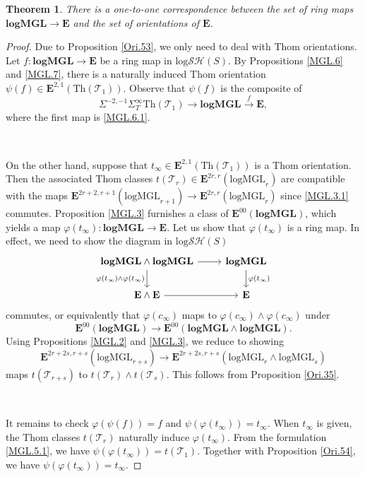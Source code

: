 \documentclass[11pt, a4paper]{amsart}
\newtheorem{thm}{Theorem}[subsection]
\theoremstyle{definition}
\numberwithin{equation}{subsection}
\newcommand{\Thom}{\mathrm{Th}}
\newcommand{\logMGL}{{\mathrm{logMGL}}}
\newcommand{\spectlogMGL}{{\mathbf{logMGL}}}
\newcommand{\cT}{\mathcal{T}}
\newcommand{\ringE}{\mathbf{E}}
\newcommand{\inflogSH}{\mathrm{log}\mathcal{SH}}
\begin{document}
\begin{thm}
\label{MGL.5}
There is a one-to-one correspondence between the set of ring maps $\spectlogMGL\to \ringE$ 
and the set of orientations of $\ringE$.
\end{thm}
\begin{proof}
Due to Proposition \ref{Ori.53}, we only need to deal with Thom orientations.
Let $f\colon \spectlogMGL\to \ringE$ be a ring map in $\inflogSH(S)$.
By Propositions \ref{MGL.6} and \ref{MGL.7}, 
there is a naturally induced Thom orientation $\psi(f)\in \ringE^{2,1}(\Thom(\cT_1))$.
Observe that $\psi(f)$ is the composite of
\begin{equation}
\label{MGL.5.1}
\Sigma^{-2,-1}\Sigma_T^\infty \Thom(\cT_1)\to \spectlogMGL\xrightarrow{f}\ringE,
\end{equation}
where the first map is \eqref{MGL.6.1}.

\

On the other hand, 
suppose that $t_\infty\in \ringE^{2,1}(\Thom(\cT_1))$ is a Thom orientation.
Then the associated Thom classes $t(\cT_r)\in \ringE^{2r,r}(\logMGL_r)$ are 
compatible with the maps 
$\ringE^{2r+2,r+1}(\logMGL_{r+1})\to \ringE^{2r,r}(\logMGL_r)$ since 
\eqref{MGL.3.1} commutes.
Proposition \ref{MGL.3} furnishes
a class of $\ringE^{00}(\spectlogMGL)$,
which yields a map $\varphi(t_\infty)\colon \spectlogMGL\to \ringE$.
Let us show that $\varphi(t_\infty)$ is a ring map.
In effect, we need to show the diagram in $\inflogSH(S)$
\[
\begin{tikzcd}
\spectlogMGL\wedge \spectlogMGL\ar[r]\ar[d,"\varphi(t_\infty)\wedge\varphi(t_\infty)"']&
\spectlogMGL\ar[d,"\varphi(t_\infty)"]
\\
\ringE \wedge \ringE \ar[r]&
\ringE
\end{tikzcd}
\]
commutes, 
or equivalently that $\varphi(c_\infty)$ maps to $\varphi(c_\infty)\wedge \varphi(c_\infty)$ under 
\[
\ringE^{00}(\spectlogMGL)\to \ringE^{00}(\spectlogMGL\wedge \spectlogMGL).
\]
Using Propositions \ref{MGL.2} and \ref{MGL.3}, we reduce to showing 
\[
\ringE^{2r+2s,r+s}(\logMGL_{r+s})\to \ringE^{2r+2s,r+s}(\logMGL_r\wedge \logMGL_s)
\]
maps $t(\cT_{r+s})$ to $t(\cT_r)\wedge t(\cT_{s})$.
This follows from Proposition \ref{Ori.35}.

\

It remains to check $\varphi(\psi(f))=f$ and $\psi(\varphi(t_\infty))=t_\infty$.
When $t_\infty$ is given, the Thom classes $t(\cT_r)$ naturally induce $\varphi(t_\infty)$.
From the formulation \eqref{MGL.5.1}, we have $\psi(\varphi(t_\infty))=t(\cT_1)$.
Together with Proposition \ref{Ori.54}, we have $\psi(\varphi(t_\infty))=t_\infty$.


\end{proof}
\end{document}
